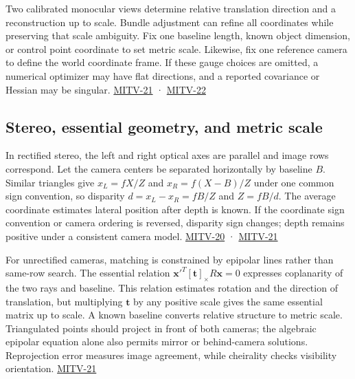 \hypertarget{04-visual-computing-ii-ch032-d.-how-do-scale-and-pose-ambiguities-enter-reconstruction}{}

Two calibrated monocular views determine relative translation direction and a reconstruction up to scale. Bundle adjustment can refine all coordinates while preserving that scale ambiguity. Fix one baseline length, known object dimension, or control point coordinate to set metric scale. Likewise, fix one reference camera to define the world coordinate frame. If these gauge choices are omitted, a numerical optimizer may have flat directions, and a reported covariance or Hessian may be singular. \hyperref[04-visual-computing-ii-ch036-mitv-21---relative-orientation-binocular-stereo-structure-quadrics-calibration-reprojection]{MITV-21} · \hyperref[04-visual-computing-ii-ch036-mitv-22---exterior-orientation-recovering-position-orientation-bundle-adjustment-object-shape]{MITV-22}

\subsection{Stereo, essential geometry, and metric scale}\label{04-visual-computing-ii-ch032-stereo-essential-geometry-and-metric-scale}

\hypertarget{04-visual-computing-ii-ch032-stereo-essential-geometry-and-metric-scale}{}

In rectified stereo, the left and right optical axes are parallel and image rows correspond. Let the camera centers be separated horizontally by baseline \(B\). Similar triangles give \(x_L=fX/Z\) and \(x_R=f(X-B)/Z\) under one common sign convention, so disparity \(d=x_L-x_R=fB/Z\) and \(Z=fB/d\). The average coordinate estimates lateral position after depth is known. If the coordinate sign convention or camera ordering is reversed, disparity sign changes; depth remains positive under a consistent camera model. \hyperref[04-visual-computing-ii-ch036-mitv-20---space-of-rotations-regular-tessellations-critical-surfaces-binocular-stereo]{MITV-20} · \hyperref[04-visual-computing-ii-ch036-mitv-21---relative-orientation-binocular-stereo-structure-quadrics-calibration-reprojection]{MITV-21}

For unrectified cameras, matching is constrained by epipolar lines rather than same-row search. The essential relation \(\mathbf{x}'^T[\mathbf t]_\times R\mathbf{x}=0\) expresses coplanarity of the two rays and baseline. This relation estimates rotation and the direction of translation, but multiplying \(\mathbf t\) by any positive scale gives the same essential matrix up to scale. A known baseline converts relative structure to metric scale. Triangulated points should project in front of both cameras; the algebraic epipolar equation alone also permits mirror or behind-camera solutions. Reprojection error measures image agreement, while cheirality checks visibility orientation. \hyperref[04-visual-computing-ii-ch036-mitv-21---relative-orientation-binocular-stereo-structure-quadrics-calibration-reprojection]{MITV-21}

